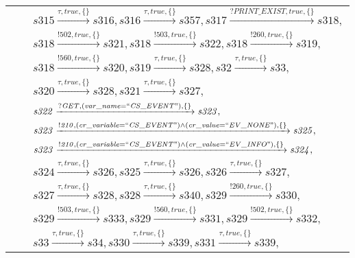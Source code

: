 \begin{tabular}{lcp{350px}}
& & $\mathit{s315}\xrightarrow{\mathit{\tau}, \mathit{true}, \{\}}\mathit{s316},\mathit{s316}\xrightarrow{\mathit{\tau}, \mathit{true}, \{\}}\mathit{s357},\mathit{s317}\xrightarrow{\mathit{?PRINT\_EXIST}, \mathit{true}, \{\}}\mathit{s318},$ \\
& & $\mathit{s318}\xrightarrow{\mathit{!502}, \mathit{true}, \{\}}\mathit{s321},\mathit{s318}\xrightarrow{\mathit{!503}, \mathit{true}, \{\}}\mathit{s322},\mathit{s318}\xrightarrow{\mathit{!260}, \mathit{true}, \{\}}\mathit{s319},$ \\
& & $\mathit{s318}\xrightarrow{\mathit{!560}, \mathit{true}, \{\}}\mathit{s320},\mathit{s319}\xrightarrow{\mathit{\tau}, \mathit{true}, \{\}}\mathit{s328},\mathit{s32}\xrightarrow{\mathit{\tau}, \mathit{true}, \{\}}\mathit{s33},$ \\
& & $\mathit{s320}\xrightarrow{\mathit{\tau}, \mathit{true}, \{\}}\mathit{s328},\mathit{s321}\xrightarrow{\mathit{\tau}, \mathit{true}, \{\}}\mathit{s327},$ \\
& & $\mathit{s322}\xrightarrow{\mathit{?GET}, \mathit{(var\_name = ``CS\_EVENT")}, \{\}}\mathit{s323},$ \\
& & $\mathit{s323}\xrightarrow{\mathit{!210}, \mathit{(cr\_variable = ``CS\_EVENT") \land (cr\_value = ``EV\_NONE")}, \{\}}\mathit{s325},$ \\
& & $\mathit{s323}\xrightarrow{\mathit{!210}, \mathit{(cr\_variable = ``CS\_EVENT") \land (cr\_value = ``EV\_INFO")}, \{\}}\mathit{s324},$ \\
& & $\mathit{s324}\xrightarrow{\mathit{\tau}, \mathit{true}, \{\}}\mathit{s326},\mathit{s325}\xrightarrow{\mathit{\tau}, \mathit{true}, \{\}}\mathit{s326},\mathit{s326}\xrightarrow{\mathit{\tau}, \mathit{true}, \{\}}\mathit{s327},$ \\
& & $\mathit{s327}\xrightarrow{\mathit{\tau}, \mathit{true}, \{\}}\mathit{s328},\mathit{s328}\xrightarrow{\mathit{\tau}, \mathit{true}, \{\}}\mathit{s340},\mathit{s329}\xrightarrow{\mathit{!260}, \mathit{true}, \{\}}\mathit{s330},$ \\
& & $\mathit{s329}\xrightarrow{\mathit{!503}, \mathit{true}, \{\}}\mathit{s333},\mathit{s329}\xrightarrow{\mathit{!560}, \mathit{true}, \{\}}\mathit{s331},\mathit{s329}\xrightarrow{\mathit{!502}, \mathit{true}, \{\}}\mathit{s332},$ \\
& & $\mathit{s33}\xrightarrow{\mathit{\tau}, \mathit{true}, \{\}}\mathit{s34},\mathit{s330}\xrightarrow{\mathit{\tau}, \mathit{true}, \{\}}\mathit{s339},\mathit{s331}\xrightarrow{\mathit{\tau}, \mathit{true}, \{\}}\mathit{s339},$ \\

\end{tabular}
